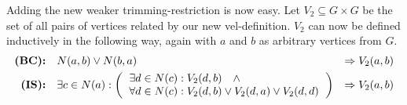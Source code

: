 Adding the new weaker trimming-restriction is now easy.
Let $V_2 \subseteq G \times G$ be the set of all pairs of vertices related by our new vel-definition.
$V_2$ can now be defined inductively in the following way, again with $a$ and $b$ as arbitrary vertices from $G$.
\begin{align}
  \textbf{(BC):}&\quad N(a,b) \vee N(b,a) &\Rightarrow V_2(a,b)\\
  \textbf{(IS):}&\quad \exists c \in N(a):
  \left ( \begin{tabular}{l}
  $\exists d \in N(c): V_2(d,b) \quad \wedge$\\
  $\forall d \in N(c): V_2(d,b) \vee V_2(d,a) \vee V_2(d,d)$
  \end{tabular} \right )
  &\Rightarrow V_2(a,b)
\end{align}
